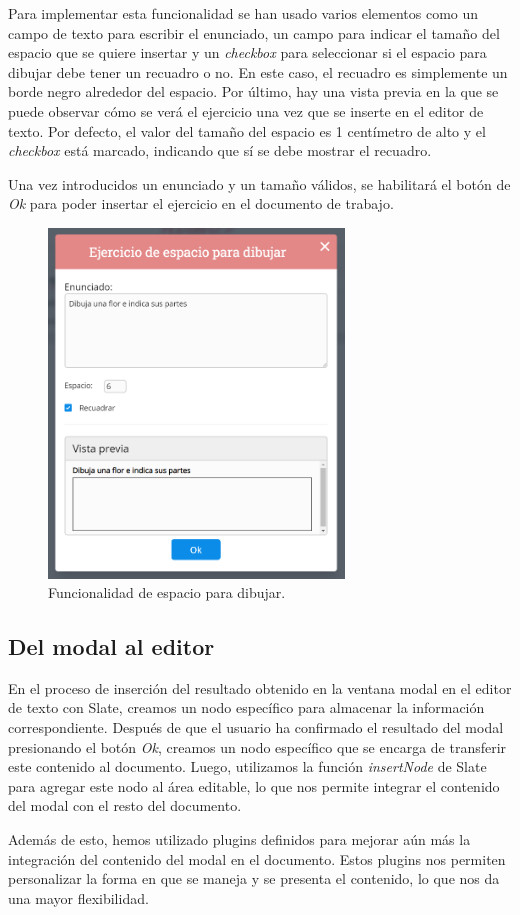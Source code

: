 Para implementar esta funcionalidad se han usado varios elementos como un campo de texto para escribir el enunciado, un campo para indicar el tamaño del espacio que se quiere insertar y un \textit{checkbox} para seleccionar si el espacio para dibujar debe tener un recuadro o no. En este caso, el recuadro es simplemente un borde negro alrededor del espacio. Por último, hay una vista previa en la que se puede observar cómo se verá el ejercicio una vez que se inserte en el editor de texto. Por defecto, el valor del tamaño del espacio es 1 centímetro de alto y el \textit{checkbox} está marcado, indicando que sí se debe mostrar el recuadro.

Una vez introducidos un enunciado y un tamaño válidos, se habilitará el botón de \textit{Ok} para poder insertar el ejercicio en el documento de trabajo.


\begin{figure}[ht!]
  \centering
  \includegraphics[width=0.7\textwidth]{Imagenes/Funcionalidades/EspacioParaDibujar.PNG}
  \caption{Funcionalidad de espacio para dibujar.}
  \label{fig:funcionalidadEspacioParaDibujar}
\end{figure}



\subsection{Del modal al editor}
En el proceso de inserción del resultado obtenido en la ventana modal en el editor de texto con Slate, creamos un nodo específico para almacenar la información correspondiente. Después de que el usuario ha confirmado el resultado del modal presionando el botón \textit{Ok}, creamos un nodo específico que se encarga de transferir este contenido al documento. Luego, utilizamos la función \textit{insertNode} de Slate para agregar este nodo al área editable, lo que nos permite integrar el contenido del modal con el resto del documento.

Además de esto, hemos utilizado plugins definidos para mejorar aún más la integración del contenido del modal en el documento. Estos plugins nos permiten personalizar la forma en que se maneja y se presenta el contenido, lo que nos da una mayor flexibilidad.

